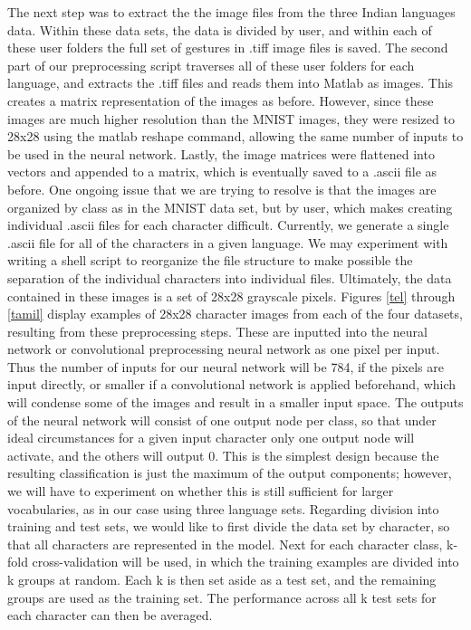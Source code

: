 \documentclass[12pt]{article}  %
\begin{document}
The next step was to extract the the image files from the three Indian languages data. Within these data sets, the data is divided by user, and within each of these user folders the full set of gestures in .tiff image files is saved. The second part of our preprocessing script traverses all of these user folders for each language, and extracts the .tiff files and reads them into Matlab as images. This creates a matrix representation of the images as before. However, since these images are much higher resolution than the MNIST images, they were resized to 28x28 using the matlab reshape command, allowing the same number of inputs to be used in the neural network. Lastly, the image matrices were flattened into vectors and appended to a matrix, which is eventually saved to a .ascii file as before. One ongoing issue that we are trying to resolve is that the images are organized by class as in the MNIST data set, but by user, which makes creating individual .ascii files for each character difficult. Currently, we generate a single .ascii file for all of the characters in a given language. We may experiment with writing a shell script to reorganize the file structure to make possible the separation of the individual characters into individual files.
Ultimately, the data contained in these images is a set of 28x28 grayscale pixels.  Figures \ref{tel} through \ref{tamil} display examples of 28x28 character images from each of the four datasets, resulting from these preprocessing steps. These are inputted into the neural network or convolutional preprocessing neural network as one pixel per input. Thus the number of inputs for our neural network will be 784, if the pixels are input directly, or smaller if a convolutional network is applied beforehand, which will condense some of the images and result in a smaller input space. The outputs of the neural network will consist of one output node per class, so that under ideal circumstances for a given input character only one output node will activate, and the others will output 0. This is the simplest design because the resulting classification is just the maximum of the output components; however, we will have to experiment on whether this is still sufficient for larger vocabularies, as in our case using three language sets. Regarding division into training and test sets, we would like to first divide the data set by character, so that all characters are represented in the model. Next for each character class, k-fold cross-validation will be used, in which the training examples are divided into k groups at random. Each k is then set aside as a test set, and the remaining groups are used as the training set. The performance across all k test sets for each character can then be averaged. 





\balance
\end{document}
